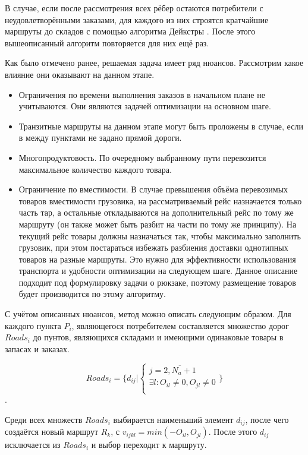 	В случае, если после рассмотрения всех рёбер остаются потребители с неудовлетворёнными заказами, для каждого из них строятся кратчайшие маршруты до складов с помощью алгоритма Дейкстры \cite{alg:Corman}. После этого вышеописанный алгоритм повторяется для них ещё раз.
	
	Как было отмечено ранее, решаемая задача имеет ряд нюансов. Рассмотрим какое влияние они оказывают на данном этапе.
	\begin{itemize}
		\item Ограничения по времени выполнения заказов в начальном плане не учитываются. Они являются задачей оптимизации на основном шаге.
		\item Транзитные маршруты на данном этапе могут быть проложены в случае, если в между пунктами не задано прямой дороги.
		\item Многопродуктовость\cite{trans:polyprod}. По очередному выбранному пути перевозится максимальное количество каждого товара. 
		\item Ограничение по вместимости. В случае превышения объёма перевозимых товаров вместимости грузовика, на рассматриваемый рейс назначается только часть тар, а остальные откладываются на дополнительный рейс по тому же маршруту (он также может быть разбит на части по тому же принципу). На текущий рейс товары должны назначаться так, чтобы максимально заполнить грузовик, при этом постараться избежать разбиения доставки однотипных товаров на разные маршруты. Это нужно для эффективности использования транспорта и удобности оптимизации на следующем шаге. Данное описание подходит под формулировку задачи о рюкзаке\cite{alg:Skiena}, поэтому размещение товаров будет производится по этому алгоритму.
	\end{itemize}
	
	С учётом описанных нюансов, метод можно описать следующим образом. Для каждого пункта $P_i$, являющегося потребителем составляется множество дорог $Roads_i$ до пунтов, являющихся складами и имеющими одинаковые товары в запасах и заказах. 
	
	\begin{equation}
		Roads_i = \{
			d_{ij} 
			| 
			\left\{ \begin{array}{ccc}	
				j = \overline{2, N_a + 1} \\
				\exists l: O_{il} \ne 0, O_{jl} \ne 0\\
			\end{array}	\right.
		\}
	\end{equation}.

	Среди всех множеств $Roads_i$ выбирается наименьший элемент $d_{ij}$, после чего создаётся новый маршрут $R_k$, с $v_{ijkl} = min(-O_{il}, O_{jl})$. После этого $d_{ij}$ исключается из $Roads_i$ и выбор переходит к маршруту.
	
